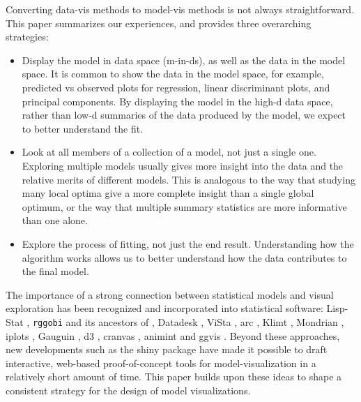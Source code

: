 \documentclass[preprint]{imsart}
\begin{document}
Converting data-vis methods to model-vis methods is not always straightforward. This paper summarizes our experiences, and provides three overarching strategies:

\begin{itemize}
\item Display the model in data space (m-in-ds), as well as the
  data in the model space. It is common to show the data in the model
  space, for example, predicted vs observed plots for regression,
  linear discriminant plots, and principal components.  By displaying
  the model in the high-d data space, rather than low-d summaries of the
  data produced by the model, we expect to better understand the fit.

\item Look at all members of a collection of a model, not just
  a single one.  Exploring multiple models  usually gives more insight into
  the data and the relative merits of different models. This is
  analogous to the way that studying many local optima  give a more
  complete insight than a single global optimum, or the way that
  multiple summary statistics are more informative than one alone.

\item Explore the process of fitting, not just the
  end result.  Understanding how the algorithm works allows us to
  better understand how the data contributes to the final model.

\end{itemize}

The importance of a strong connection between statistical models and visual exploration has been recognized and incorporated into statistical software: Lisp-Stat \citep{tierney:1990}, {\tt rggobi} and its ancestors of \citep{swayne:1991}, Datadesk \citep{velleman:1992}, ViSta \citep{young:1993}, {\sc arc} \citep{cook:1998}, Klimt \citep{urbanek:2002a}, Mondrian \citep{theus:2003}, iplots \citep{iplots},  Gauguin \citep{gribov:2007}, d3 \citep{bostock:2011}, cranvas \citep{cranvas:2013}, animint \citep{hocking:2015} and ggvis \citep{chang:2015}. Beyond these approaches, new developments such as the shiny package \citep{shiny} have made it possible to draft interactive, web-based proof-of-concept tools for model-visualization  in a relatively short amount of time.
 This paper builds upon these ideas to shape a consistent strategy for the design of model visualizations.
\end{document}
